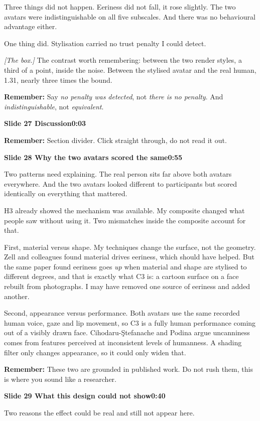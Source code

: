 \documentclass[11pt,a4paper]{article}
\newcommand{\slidehead}[3]{%
  \needspace{5\baselineskip}
  \vspace{0.9em}
  \noindent\colorbox{knblue}{\parbox{0.978\textwidth}{\vspace{1pt}\color{white}\textbf{Slide #1 \quad #2}\hfill\textbf{#3}\vspace{1pt}}}
  \vspace{0.35em}\par}
\newcommand{\remind}[1]{%
  \vspace{0.15em}
  \noindent\colorbox{knlight}{\parbox{0.972\textwidth}{\small\color{knblue}\textbf{Remember:} #1}}
  \vspace{0.2em}\par}
\newcommand{\pointto}[1]{{\color{knaccent}\textit{[#1]}}}
\begin{document}
Three things did not happen. Eeriness did not fall, it rose slightly. The two avatars were indistinguishable on all five subscales. And there was no behavioural advantage either.

One thing did. Stylisation carried no trust penalty I could detect.

\pointto{The box.} The contrast worth remembering: between the two render styles, a third of a point, inside the noise. Between the stylised avatar and the real human, 1.31, nearly three times the bound.

\remind{Say \emph{no penalty was detected}, not \emph{there is no penalty}. And \emph{indistinguishable}, not \emph{equivalent}.}

\slidehead{27}{Discussion}{0:03}

\remind{Section divider. Click straight through, do not read it out.}

\slidehead{28}{Why the two avatars scored the same}{0:55}

Two patterns need explaining. The real person sits far above both avatars everywhere. And the two avatars looked different to participants but scored identically on everything that mattered.

H3 already showed the mechanism was available. My composite changed what people saw without using it. Two mismatches inside the composite account for that.

First, material versus shape. My techniques change the surface, not the geometry. Zell and colleagues found material drives eeriness, which should have helped. But the same paper found eeriness goes \emph{up} when material and shape are stylised to different degrees, and that is exactly what C3 is: a cartoon surface on a face rebuilt from photographs. I may have removed one source of eeriness and added another.

Second, appearance versus performance. Both avatars use the same recorded human voice, gaze and lip movement, so C3 is a fully human performance coming out of a visibly drawn face. Cihodaru-\c{S}tefanache and Podina argue uncanniness comes from features perceived at inconsistent levels of humanness. A shading filter only changes appearance, so it could only widen that.

\remind{These two are grounded in published work. Do not rush them, this is where you sound like a researcher.}

\slidehead{29}{What this design could not show}{0:40}

Two reasons the effect could be real and still not appear here.
\end{document}

